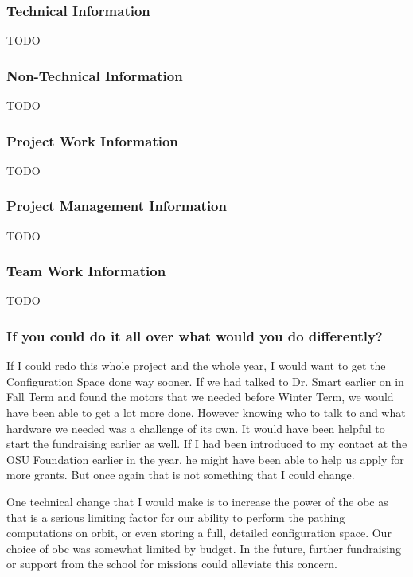 \subsubsection{Technical Information}
TODO

\subsubsection{Non-Technical Information}
TODO

\subsubsection{Project Work Information}
TODO

\subsubsection{Project Management Information}
TODO

\subsubsection{Team Work Information}
TODO

\subsubsection{If you could do it all over what would you do differently?}
If I could redo this whole project and the whole year, I would want to get the Configuration Space done way sooner. If we had talked to Dr. Smart earlier on in Fall Term and found the motors that we needed before Winter Term, we would have been able to get a lot more done. However knowing who to talk to and what hardware we needed was a challenge of its own. It would have been helpful to start the fundraising earlier as well. If I had been introduced to my contact at the OSU Foundation earlier in the year, he might have been able to help us apply for more grants. But once again that is not something that I could change.

One technical change that I would make is to increase the power of the \gls{obc} as that is a serious limiting factor for our ability to perform the pathing computations on orbit, or even storing a full, detailed configuration space. Our choice of \gls{obc} was somewhat limited by budget. In the future, further fundraising or support from the school for missions could alleviate this concern.

